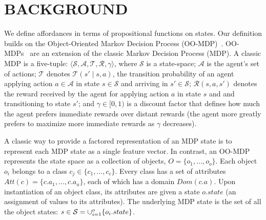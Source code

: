 \documentclass[]{article}
\begin{document}


\section{BACKGROUND}

We define affordances in terms of propositional functions on states.
Our definition builds on the Object-Oriented Markov Decision Process
(OO-MDP)~\citep{diuk08}.  OO-MDPs~\citep{diuk08} are an extension of
the classic Markov Decision Process (MDP).  A classic MDP is a
five-tuple: $\langle \mathcal{S}, \mathcal{A}, \mathcal{T},
\mathcal{R}, \gamma \rangle$, where $\mathcal{S}$ is a state-space;
$\mathcal{A}$ is the agent's set of actions; $\mathcal{T}$ denotes
$\mathcal{T}(s' \mid s,a)$, the transition probability of an agent
applying action $a \in \mathcal{A}$ in state $s \in \mathcal{S}$ and
arriving in $s' \in \mathcal{S}$; $\mathcal{R}(s,a,s')$ denotes the
reward received by the agent for applying action $a$ in state $s$ and
and transitioning to state $s'$; and $\gamma \in [0, 1)$ is a discount
  factor that defines how much the agent prefers immediate rewards
  over distant rewards (the agent more greatly prefers to maximize
  more immediate rewards as $\gamma$ decreases).


A classic way to provide a factored representation of an MDP state is to represent
each MDP state as a single feature vector. In contrast, an OO-MDP represents the state space as a collection of objects,
$O = \{o_1, \ldots, o_o \}$.  Each object $o_i$ belongs to a
class $c_j \in  \{c_1, \ldots, c_c\}$. Every class has a set of attributes
$Att(c) = \{c.a_1, \ldots, c.a_a \}$, each of which has a domain $Dom(c.a)$.
Upon instantiation of an object class, its attributes are given a state $o.state$
(an assignment of values to its attributes).  The underlying MDP state is the set
of all the object states: $s \in {\cal S} = \cup_{i = 1}^o \{o_i.state\}$.
\end{document}
